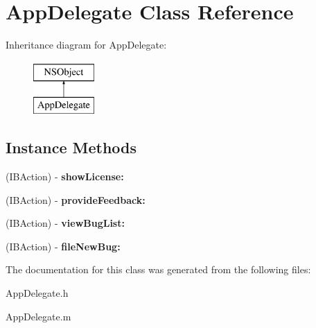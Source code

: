 \hypertarget{interface_app_delegate}{}\section{App\+Delegate Class Reference}
\label{interface_app_delegate}
Inheritance diagram for App\+Delegate\+:\begin{figure}[H]
\begin{center}
\leavevmode
\includegraphics[height=2.000000cm]{interface_app_delegate}
\end{center}
\end{figure}
\subsection*{Instance Methods}
\begin{DoxyCompactItemize}
\item 
\mbox{\label{interface_app_delegate_a582dd9f04c4df7ce7011b811c92f2712}} 
(I\+B\+Action) -\/ {\bfseries show\+License\+:}
\item 
\mbox{\label{interface_app_delegate_aee94aa52a6ed48d72be575321d4d3c3f}} 
(I\+B\+Action) -\/ {\bfseries provide\+Feedback\+:}
\item 
\mbox{\label{interface_app_delegate_ab39d1a44e5b1dc42a06f005ba4eacf23}} 
(I\+B\+Action) -\/ {\bfseries view\+Bug\+List\+:}
\item 
\mbox{\label{interface_app_delegate_a7d40f67bfa3198dcd4413db6c558b96f}} 
(I\+B\+Action) -\/ {\bfseries file\+New\+Bug\+:}
\end{DoxyCompactItemize}


The documentation for this class was generated from the following files\+:\begin{DoxyCompactItemize}
\item 
App\+Delegate.\+h\item 
App\+Delegate.\+m\end{DoxyCompactItemize}
